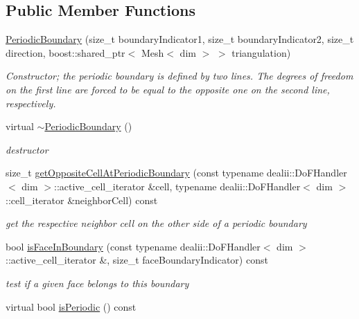 \subsection*{Public Member Functions}
\begin{DoxyCompactItemize}
\item 
\hyperlink{classnatrium_1_1PeriodicBoundary_ad105994a331755f654822813875771d8}{PeriodicBoundary} (size\_\-t boundaryIndicator1, size\_\-t boundaryIndicator2, size\_\-t direction, boost::shared\_\-ptr$<$ Mesh$<$ dim $>$ $>$ triangulation)
\begin{DoxyCompactList}\small\item\em Constructor; the periodic boundary is defined by two lines. The degrees of freedom on the first line are forced to be equal to the opposite one on the second line, respectively. \item\end{DoxyCompactList}\item 
\hypertarget{classnatrium_1_1PeriodicBoundary_ad5f86b54a5a3ff86593ddb0e69b352e4}{
virtual \hyperlink{classnatrium_1_1PeriodicBoundary_ad5f86b54a5a3ff86593ddb0e69b352e4}{$\sim$PeriodicBoundary} ()}
\label{classnatrium_1_1PeriodicBoundary_ad5f86b54a5a3ff86593ddb0e69b352e4}

\begin{DoxyCompactList}\small\item\em destructor \item\end{DoxyCompactList}\item 
size\_\-t \hyperlink{classnatrium_1_1PeriodicBoundary_aaa861135e070feb4b3dd4408c487cd14}{getOppositeCellAtPeriodicBoundary} (const typename dealii::DoFHandler$<$ dim $>$::active\_\-cell\_\-iterator \&cell, typename dealii::DoFHandler$<$ dim $>$::cell\_\-iterator \&neighborCell) const 
\begin{DoxyCompactList}\small\item\em get the respective neighbor cell on the other side of a periodic boundary \item\end{DoxyCompactList}\item 
bool \hyperlink{classnatrium_1_1PeriodicBoundary_af43c1306653cc8a9d5aea68edcfca370}{isFaceInBoundary} (const typename dealii::DoFHandler$<$ dim $>$::active\_\-cell\_\-iterator \&, size\_\-t faceBoundaryIndicator) const 
\begin{DoxyCompactList}\small\item\em test if a given face belongs to this boundary \item\end{DoxyCompactList}\item 
\hypertarget{classnatrium_1_1PeriodicBoundary_a38c5e966e4b2a1ee185a5634fc379393}{
virtual bool \hyperlink{classnatrium_1_1PeriodicBoundary_a38c5e966e4b2a1ee185a5634fc379393}{isPeriodic} () const }
\label{classnatrium_1_1PeriodicBoundary_a38c5e966e4b2a1ee185a5634fc379393}


\end{DoxyCompactItemize}
